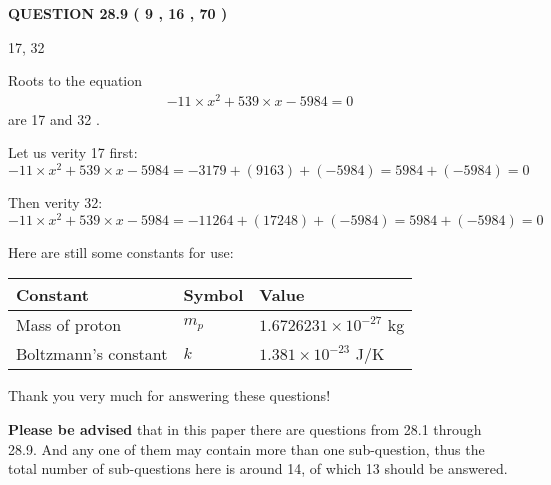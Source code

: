 \documentclass[12pt]{article}
\begin{document}
 
 
  
\vspace{0.2in}
  
{\textbf{\Large{QUESTION
28.9 
 (           9 ,          16 ,          70 )
}}}
  
  


 
 
\noindent{}

17,  %
32
 
 
 
 
 
\noindent{}

Roots to the equation
\begin{eqnarray*}
-11 \times x^2  %
+  %
539
                 \times x    %
-5984 =0
\end{eqnarray*}
are  %
17 and  %
32 .
 
Let us verity  %
17 first:
$  %
-11 \times x^2  %
+  %
539
                 \times x    %
-5984
  = %
-3179+( %
9163)+( %
-5984)
  = %
5984+( %
-5984)
  = %
0
$
 
Then verity  %
32:
$  %
-11 \times x^2  %
+  %
539
                 \times x    %
-5984
  = %
-11264+( %
17248)+( %
-5984)
  = %
5984+( %
-5984)
  = %
0
$
 
 
 
   
   
 \vspace{0.2in}
Here are still some constants for use:
 
 
\noindent\begin{tabular}{|l|l|l|}
\hline
Constant & Symbol & Value \\
\hline
 
Mass of proton &
$m_p$ &
 $ 1.6726231 \times 10^{-27} $
kg \\
\hline
 
Boltzmann's constant &
$k$ &
 $ 1.381 \times 10^{-23} $
J/K \\
\hline
 
\end{tabular}
 
Thank you very much for answering these questions!
 
{\textbf{\large{Please be advised}}} that in this paper there are questions from
28.1 through
28.9.
And any one of them may contain more than one sub-question, thus the total number
of sub-questions here is around 14, of which
13 should be answered.
 
\end{document}
